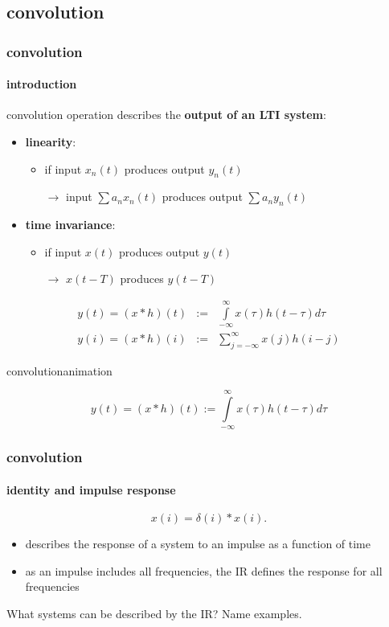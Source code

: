         \subsection{convolution}
	\begin{frame}\frametitle{convolution}\framesubtitle{introduction}
        convolution operation describes the \textbf{output of an LTI system}:
        \pause
        \begin{itemize}
            \item   \textbf{linearity}: 
                \begin{itemize}
                    \item if input $x_n(t)$ produces output $y_n(t)$
                    \item[$\rightarrow$] input $\sum a_n x_n(t)$ produces output $\sum a_n y_n(t)$
                \end{itemize}
            \item   \textbf{time invariance}:
                \begin{itemize}
                    \item   if input $x(t)$ produces output $y(t)$
                    \item[$\rightarrow$] $x(t-T)$ produces $y(t-T)$
                \end{itemize}
        \end{itemize}
        \pause
        \begin{eqnarray*}\nonumber
            y(t) = (x \ast h)(t) &:=& \int\limits_{-\infty}^{\infty}x(\tau)h(t-\tau)d\tau\\
            y(i) = (x \ast h)(i) &:=& \sum\limits_{j=-\infty}^{\infty}x(j)h(i-j)
        \end{eqnarray*}
	\end{frame}
    
\begin{frame}{convolution}{animation}
    \vspace{-5mm}
    \begin{footnotesize}
    \begin{equation}
        y(t) = (x \ast h)(t) := \int\limits_{-\infty}^{\infty}x(\tau)h(t-\tau)d\tau
    \end{equation}
    \end{footnotesize}
\end{frame}
    
\begin{frame}\frametitle{convolution}\framesubtitle{identity and impulse response}
    \begin{equation}
        x(i) = \delta(i)\ast x(i) .
    \end{equation}
    \pause
    \begin{itemize}
        \item   describes the response of a system to an impulse as a function of time
        \item   as an impulse includes all frequencies, the IR defines the response for all frequencies
    \end{itemize}
    \pause
    What systems can be described by the IR? Name examples.
\end{frame}
    
